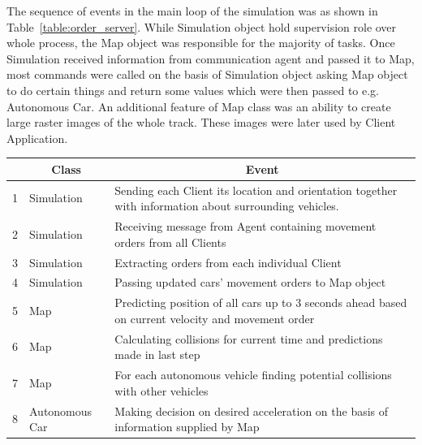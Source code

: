 \documentclass[11pt,english,twoside]{article}
\begin{document}
The sequence of events in the main loop of the simulation was as shown in Table~\ref{table:order_server}. While Simulation object hold supervision role over whole process, the Map object was responsible for the majority of tasks. Once Simulation received information from communication agent and passed it to Map, most commands were called on the basis of Simulation object asking Map object to do certain things and return some values which were then passed to e.g. Autonomous Car. An additional feature of Map class was an ability to create large raster images of the whole track. These images were later used by Client Application.


\begin{table}[]
\centering
\begin{tabular}{|l|p{2cm}|p{11cm}|}
\hline
\textbf{} & \multicolumn{1}{c|}{\textbf{Class}} & \multicolumn{1}{c|}{\textbf{Event}}                                                                    \\ \hline
1         & Simulation                          & Sending each Client its location and orientation together with information about surrounding vehicles. \\ \hline
2         & Simulation                          & Receiving message from Agent containing movement orders from all Clients                                \\ \hline
3         & Simulation                          & Extracting orders from each individual Client                                                          \\ \hline
4         & Simulation                          & Passing updated cars' movement orders to Map object                                                    \\ \hline
5         & Map                                 & Predicting position of all cars up to 3 seconds ahead based on current velocity and movement order     \\ \hline
6         & Map                                 & Calculating collisions for current time and predictions made in last step                              \\ \hline
7         & Map                                 & For each autonomous vehicle finding potential collisions with other vehicles                           \\ \hline
8         & Autonomous Car                      & Making decision on desired acceleration on the basis of information supplied by Map                    \\ \hline

\end{tabular}
\end{table}
\end{document}
